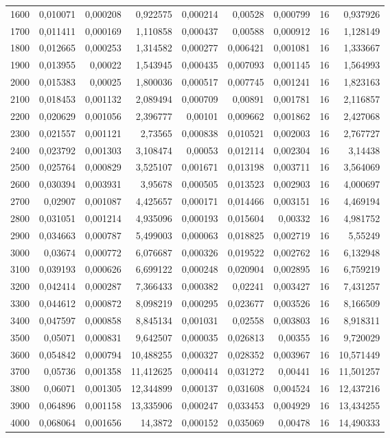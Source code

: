 \begin{tabular}{r r r r r r r r r}
1600 & 0,010071 & 0,000208 & 0,922575 & 0,000214 & 0,00528 & 0,000799 & 16 & 0,937926 \\
1700 & 0,011411 & 0,000169 & 1,110858 & 0,000437 & 0,00588 & 0,000912 & 16 & 1,128149 \\
1800 & 0,012665 & 0,000253 & 1,314582 & 0,000277 & 0,006421 & 0,001081 & 16 & 1,333667 \\
1900 & 0,013955 & 0,00022 & 1,543945 & 0,000435 & 0,007093 & 0,001145 & 16 & 1,564993 \\
2000 & 0,015383 & 0,00025 & 1,800036 & 0,000517 & 0,007745 & 0,001241 & 16 & 1,823163 \\
2100 & 0,018453 & 0,001132 & 2,089494 & 0,000709 & 0,00891 & 0,001781 & 16 & 2,116857 \\
2200 & 0,020629 & 0,001056 & 2,396777 & 0,00101 & 0,009662 & 0,001862 & 16 & 2,427068 \\
2300 & 0,021557 & 0,001121 & 2,73565 & 0,000838 & 0,010521 & 0,002003 & 16 & 2,767727 \\
2400 & 0,023792 & 0,001303 & 3,108474 & 0,00053 & 0,012114 & 0,002304 & 16 & 3,14438 \\
2500 & 0,025764 & 0,000829 & 3,525107 & 0,001671 & 0,013198 & 0,003711 & 16 & 3,564069 \\
2600 & 0,030394 & 0,003931 & 3,95678 & 0,000505 & 0,013523 & 0,002903 & 16 & 4,000697 \\
2700 & 0,02907 & 0,001087 & 4,425657 & 0,000171 & 0,014466 & 0,003151 & 16 & 4,469194 \\
2800 & 0,031051 & 0,001214 & 4,935096 & 0,000193 & 0,015604 & 0,00332 & 16 & 4,981752 \\
2900 & 0,034663 & 0,000787 & 5,499003 & 0,000063 & 0,018825 & 0,002719 & 16 & 5,55249 \\
3000 & 0,03674 & 0,000772 & 6,076687 & 0,000326 & 0,019522 & 0,002762 & 16 & 6,132948 \\
3100 & 0,039193 & 0,000626 & 6,699122 & 0,000248 & 0,020904 & 0,002895 & 16 & 6,759219 \\
3200 & 0,042414 & 0,000287 & 7,366433 & 0,000382 & 0,02241 & 0,003427 & 16 & 7,431257 \\
3300 & 0,044612 & 0,000872 & 8,098219 & 0,000295 & 0,023677 & 0,003526 & 16 & 8,166509 \\
3400 & 0,047597 & 0,000858 & 8,845134 & 0,001031 & 0,02558 & 0,003803 & 16 & 8,918311 \\
3500 & 0,05071 & 0,000831 & 9,642507 & 0,000035 & 0,026813 & 0,00355 & 16 & 9,720029 \\
3600 & 0,054842 & 0,000794 & 10,488255 & 0,000327 & 0,028352 & 0,003967 & 16 & 10,571449 \\
3700 & 0,05736 & 0,001358 & 11,412625 & 0,000414 & 0,031272 & 0,00441 & 16 & 11,501257 \\
3800 & 0,06071 & 0,001305 & 12,344899 & 0,000137 & 0,031608 & 0,004524 & 16 & 12,437216 \\
3900 & 0,064896 & 0,001158 & 13,335906 & 0,000247 & 0,033453 & 0,004929 & 16 & 13,434255 \\
4000 & 0,068064 & 0,001656 & 14,3872 & 0,000152 & 0,035069 & 0,00478 & 16 & 14,490333 \\
\end{tabular}

